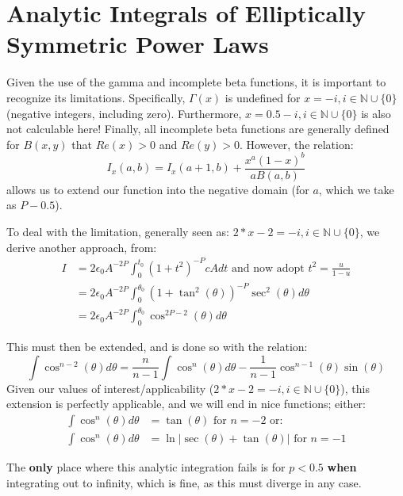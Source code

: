 \documentclass[twocolumn,traditabstract]{aa}
\begin{document}
\section{Analytic Integrals of Elliptically Symmetric Power Laws}
\label{sec:analytic_integrals}

Given the use of the gamma and incomplete beta functions, it is important to recognize its limitations.
Specifically, $\Gamma(x)$ is undefined for $x = -i, i \in \mathbb{N} \cup \{0\}$ (negative integers, including
zero). Furthermore, $x = 0.5-i, i \in \mathbb{N} \cup \{0\}$ is also not calculable here! Finally, all incomplete
beta functions are generally defined for $B(x,y)$ that $Re(x) > 0$ and $Re(y) > 0$. However, the relation:
\begin{equation}
  I_x(a,b) = I_x(a+1,b) + \frac{x^a (1-x)^b}{a B(a,b)}
  \label{eqn:recibeta}
\end{equation}
allows us to extend our function into the negative domain (for $a$, which we take as $P-0.5$). 

To deal with the limitation, generally seen as: $2*x-2 = -i, i \in \mathbb{N} \cup \{0\}$, we derive another approach, from:
\begin{align}
  I &= 2 \epsilon_0 A^{-2P} \int_{0}^{t_0}(1+t^2)^{-P} c A dt \text{ and now adopt } t^2 = \frac{u}{1-u} \\
    &= 2 \epsilon_0 A^{-2P} \int_{0}^{\theta_0}(1+\tan^2(\theta))^{-P} \sec^2(\theta) d\theta \\
    &= 2 \epsilon_0 A^{-2P} \int_{0}^{\theta_0}\cos^{2P-2}(\theta) d\theta
\end{align}

This must then be extended, and is done so with the relation:
\begin{equation}
  \int \cos^{n-2}(\theta) d\theta = \frac{n}{n-1}\int \cos^n(\theta)d\theta - \frac{1}{n-1}\cos^{n-1}(\theta)\sin(\theta) 
  \label{eqn:cosext}
\end{equation}
Given our values of interest/applicability ($2*x-2 = -i, i \in \mathbb{N} \cup \{0\}$), this extension is perfectly
applicable, and we will end in nice functions; either:
\begin{align*}
  \int \cos^n(\theta)d\theta &= \tan(\theta) \text{ for } n=-2 \text{ or: } \\
  \int \cos^n(\theta)d\theta &= \ln \vert \sec(\theta) + \tan(\theta) \vert \text{ for } n=-1
\end{align*}

The \textbf{only} place where this analytic integration fails is for $p < 0.5$ \textbf{when} integrating out to infinity,
which is fine, as this must diverge in any case. 



%

\label{references}
\end{document}
